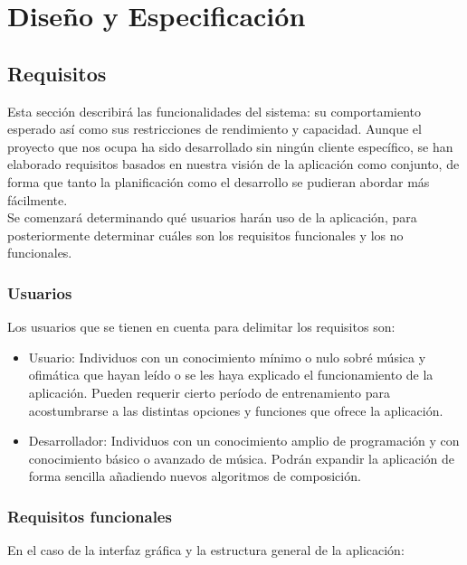 \chapter{Diseño y Especificación}


\section{Requisitos}

	Esta sección describirá las funcionalidades del sistema: su comportamiento esperado así como sus restricciones de rendimiento y capacidad. Aunque el proyecto que nos ocupa ha sido desarrollado sin ningún cliente específico, se han elaborado requisitos basados en nuestra visión de la aplicación como conjunto, de forma que tanto la planificación como el desarrollo se pudieran abordar más fácilmente.\\
	
	Se comenzará determinando qué usuarios harán uso de la aplicación, para posteriormente determinar cuáles son los requisitos funcionales y los no funcionales.
	
	\subsection{Usuarios}
	
	Los usuarios que se tienen en cuenta para delimitar los requisitos son:
	
	\begin{itemize}
		\item Usuario: Individuos con un conocimiento mínimo o nulo sobré música y ofimática que hayan leído o se les haya explicado el funcionamiento de la aplicación. Pueden requerir cierto período de entrenamiento para acostumbrarse a las distintas opciones y funciones que ofrece la aplicación.
		\item Desarrollador: Individuos con un conocimiento amplio de programación y con conocimiento básico o avanzado de música. Podrán expandir la aplicación de forma sencilla añadiendo nuevos algoritmos de composición.
	\end{itemize}

	\subsection{Requisitos funcionales}
	
	En el caso de la interfaz gráfica y la estructura general de la aplicación:


